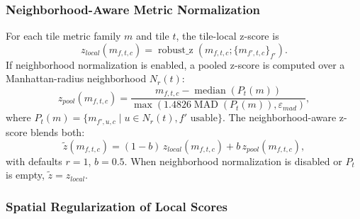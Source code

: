 \documentclass[10pt,twocolumn]{article}
\begin{document}
\subsubsection{Neighborhood-Aware Metric Normalization}

For each tile metric family $m$ and tile $t$, the tile-local z-score is
\begin{equation}
  z_{local}(m_{f,t,c}) = \operatorname{robust\_z}(m_{f,t,c};\{m_{f',t,c}\}_{f'}).
\end{equation}
If neighborhood normalization is enabled, a pooled z-score is computed over a Manhattan-radius
neighborhood $N_r(t)$:
\begin{equation}
  z_{pool}(m_{f,t,c})
  = \frac{m_{f,t,c}-\operatorname{median}(P_t(m))}{\max(1.4826\operatorname{MAD}(P_t(m)),\varepsilon_{mad})},
\end{equation}
where $P_t(m)=\{m_{f',u,c}\mid u\in N_r(t), f' \text{ usable}\}$. The neighborhood-aware
z-score blends both:
\begin{equation}
  \tilde{z}(m_{f,t,c}) = (1-b)\,z_{local}(m_{f,t,c}) + b\,z_{pool}(m_{f,t,c}),
\end{equation}
with defaults $r=1$, $b=0.5$. When neighborhood normalization is disabled or
$P_t$ is empty, $\tilde{z}=z_{local}$.

\subsubsection{Spatial Regularization of Local Scores}
\end{document}
